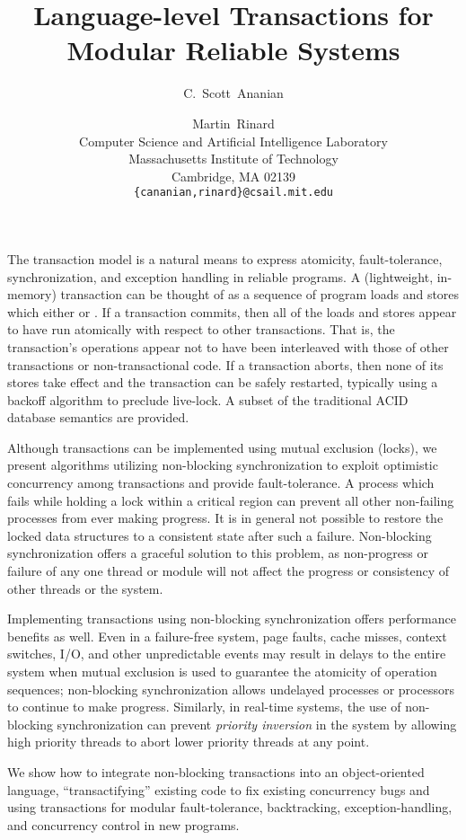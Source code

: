 \documentclass[twoside,twocolumn,notitlepage,letterpaper,9pt]{article}
\title{Language-level Transactions for Modular Reliable Systems}
\author{C.~Scott~Ananian \and Martin~Rinard \\
Computer Science and Artificial Intelligence Laboratory\\
Massachusetts Institute of Technology\\ 
Cambridge, MA 02139 \\
\texttt{\{cananian,rinard\}@csail.mit.edu}
}
\date{}
\begin{document}
\maketitle
{}

The transaction model is a natural means to express atomicity,
fault-tolerance, synchronization, and exception handling in reliable
programs.  A (lightweight, in-memory) transaction can be thought of as
a sequence of program loads and stores which either  or
.  If a transaction commits, then all of the loads and
stores appear to have run atomically with respect to other
transactions.  That is, the transaction's operations appear not to
have been interleaved with those of other transactions or
non-transactional code.  If a transaction aborts, then none of its
stores take effect and the transaction can be safely restarted,
typically using a backoff algorithm to preclude live-lock.
A subset of the traditional ACID database semantics are provided.

Although transactions can be implemented using mutual exclusion
(locks), we present algorithms utilizing non-blocking synchronization
to exploit optimistic concurrency among transactions and provide
fault-tolerance.  A process which fails while holding a lock within a
critical region can prevent all other non-failing processes from ever
making progress.  It is in general not possible to restore the locked
data structures to a consistent state after such a failure.
Non-blocking synchronization offers a graceful solution to this
problem, as non-progress or failure of any one thread or module will
not affect the progress or consistency of other threads or the system.

Implementing transactions using non-blocking synchronization offers
performance benefits as well.  Even in a failure-free system, page
faults, cache misses, context switches, I/O, and other unpredictable
events may result in delays to the entire system when mutual exclusion
is used to guarantee the atomicity of operation sequences;
non-blocking synchronization allows undelayed processes or processors
to continue to make progress.  Similarly, in real-time systems, the
use of non-blocking synchronization can prevent \emph{priority
  inversion} in the system by allowing high priority threads to abort
lower priority threads at any point.

We show how to integrate non-blocking transactions into an
object-oriented language, ``transactifying'' existing code to fix
existing concurrency bugs and using transactions for modular fault-tolerance,
backtracking, exception-handling, and concurrency control in new
programs.
\end{document}

